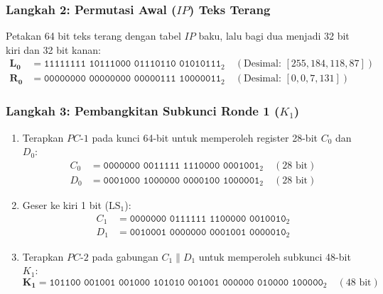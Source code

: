 \documentclass[11pt,a4paper]{article}
\begin{document}
\subsubsection*{Langkah 2: Permutasi Awal ($IP$) Teks Terang}
Petakan 64 bit teks terang dengan tabel $IP$ baku, lalu bagi dua menjadi 32 bit kiri dan 32 bit kanan:
\begin{align*}
\mathbf{L_0} &= \texttt{11111111 10111000 01110110 01010111}_2 \quad (\text{Desimal: } [255, 184, 118, 87]) \\
\mathbf{R_0} &= \texttt{00000000 00000000 00000111 10000011}_2 \quad (\text{Desimal: } [0, 0, 7, 131])
\end{align*}

\subsubsection*{Langkah 3: Pembangkitan Subkunci Ronde 1 ($K_1$)}
\begin{enumerate}[leftmargin=*]
    \item Terapkan $PC\text{-}1$ pada kunci 64-bit untuk memperoleh register 28-bit $C_0$ dan $D_0$:
    \begin{align*}
    C_0 &= \texttt{0000000 0011111 1110000 0001001}_2 \quad (28\text{ bit}) \\
    D_0 &= \texttt{0001000 1000000 0000100 1000001}_2 \quad (28\text{ bit})
    \end{align*}
    \item Geser ke kiri 1 bit ($\text{LS}_1$):
    \begin{align*}
    C_1 &= \texttt{0000000 0111111 1100000 0010010}_2 \\
    D_1 &= \texttt{0010001 0000000 0001001 0000010}_2
    \end{align*}
    \item Terapkan $PC\text{-}2$ pada gabungan $C_1 \parallel D_1$ untuk memperoleh subkunci 48-bit $K_1$:
    \begin{equation*}
    \mathbf{K_1} = \texttt{101100 001001 001000 101010 001001 000000 010000 100000}_2 \quad (48\text{ bit})
    \end{equation*}
\end{enumerate}
\end{document}

